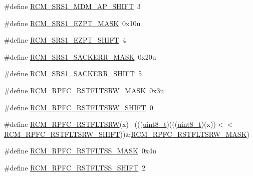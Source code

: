 \begin{DoxyCompactItemize}
\item 
\#define \hyperlink{group___r_c_m___register___masks_ga91611da7546b27a939e92926f378229f}{R\+C\+M\+\_\+\+S\+R\+S1\+\_\+\+M\+D\+M\+\_\+\+A\+P\+\_\+\+S\+H\+I\+FT}~3
\item 
\#define \hyperlink{group___r_c_m___register___masks_gaaff7d7a53676535a98915b174b862435}{R\+C\+M\+\_\+\+S\+R\+S1\+\_\+\+E\+Z\+P\+T\+\_\+\+M\+A\+SK}~0x10u
\item 
\#define \hyperlink{group___r_c_m___register___masks_ga709ca27033c866f17c9e80ccf6df88b6}{R\+C\+M\+\_\+\+S\+R\+S1\+\_\+\+E\+Z\+P\+T\+\_\+\+S\+H\+I\+FT}~4
\item 
\#define \hyperlink{group___r_c_m___register___masks_gaa09459c8ed6200a5828221f9d15656d3}{R\+C\+M\+\_\+\+S\+R\+S1\+\_\+\+S\+A\+C\+K\+E\+R\+R\+\_\+\+M\+A\+SK}~0x20u
\item 
\#define \hyperlink{group___r_c_m___register___masks_gab30a0b3f954edb8a480649686bd208fb}{R\+C\+M\+\_\+\+S\+R\+S1\+\_\+\+S\+A\+C\+K\+E\+R\+R\+\_\+\+S\+H\+I\+FT}~5
\item 
\#define \hyperlink{group___r_c_m___register___masks_ga36e0fc448dc94b90314dd6dd2dd41763}{R\+C\+M\+\_\+\+R\+P\+F\+C\+\_\+\+R\+S\+T\+F\+L\+T\+S\+R\+W\+\_\+\+M\+A\+SK}~0x3u
\item 
\#define \hyperlink{group___r_c_m___register___masks_gad869b7629ba10023abe459d7293fd281}{R\+C\+M\+\_\+\+R\+P\+F\+C\+\_\+\+R\+S\+T\+F\+L\+T\+S\+R\+W\+\_\+\+S\+H\+I\+FT}~0
\item 
\#define \hyperlink{group___r_c_m___register___masks_ga3ca72ed675321a6b8939c43f1616ecc6}{R\+C\+M\+\_\+\+R\+P\+F\+C\+\_\+\+R\+S\+T\+F\+L\+T\+S\+RW}(x)                                    ~(((\hyperlink{_p_e___types_8h_aba7bc1797add20fe3efdf37ced1182c5}{uint8\+\_\+t})(((\hyperlink{_p_e___types_8h_aba7bc1797add20fe3efdf37ced1182c5}{uint8\+\_\+t})(x))$<$$<$\hyperlink{group___r_c_m___register___masks_gad869b7629ba10023abe459d7293fd281}{R\+C\+M\+\_\+\+R\+P\+F\+C\+\_\+\+R\+S\+T\+F\+L\+T\+S\+R\+W\+\_\+\+S\+H\+I\+FT}))\&\hyperlink{group___r_c_m___register___masks_ga36e0fc448dc94b90314dd6dd2dd41763}{R\+C\+M\+\_\+\+R\+P\+F\+C\+\_\+\+R\+S\+T\+F\+L\+T\+S\+R\+W\+\_\+\+M\+A\+SK})
\item 
\#define \hyperlink{group___r_c_m___register___masks_gadfb0f8132fbbc978c9756a2adfbf2ed0}{R\+C\+M\+\_\+\+R\+P\+F\+C\+\_\+\+R\+S\+T\+F\+L\+T\+S\+S\+\_\+\+M\+A\+SK}~0x4u
\item 
\#define \hyperlink{group___r_c_m___register___masks_ga4c39eb26fa537bf5e4e6b0ea82ffaeb2}{R\+C\+M\+\_\+\+R\+P\+F\+C\+\_\+\+R\+S\+T\+F\+L\+T\+S\+S\+\_\+\+S\+H\+I\+FT}~2
$$
\end{DoxyCompactItemize}
